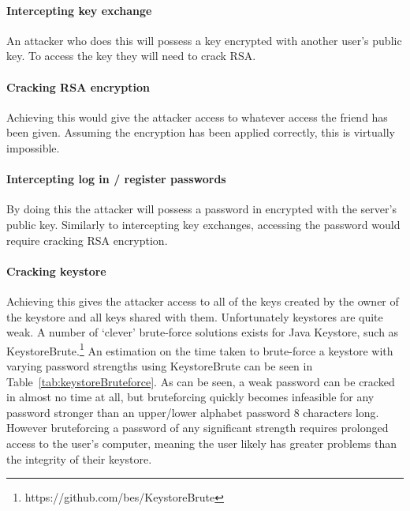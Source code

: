 \documentclass[12pt, titlepage]{article}
\begin{document}
\paragraph*{Intercepting key exchange} An attacker who does this will possess a key encrypted with another user's public key. To access the key they will need to crack RSA.

\paragraph*{Cracking RSA encryption} Achieving this would give the attacker access to whatever access the friend has been given. Assuming the encryption has been applied correctly, this is virtually impossible.

\paragraph*{Intercepting log in / register passwords} By doing this the attacker will possess a password in encrypted with the server's public key. Similarly to intercepting key exchanges, accessing the password would require cracking RSA encryption.

\paragraph*{Cracking keystore} Achieving this gives the attacker access to all of the keys created by the owner of the keystore and all keys shared with them. Unfortunately keystores are quite weak. A number of `clever' brute-force solutions exists for Java Keystore, such as KeystoreBrute.\footnote{https://github.com/bes/KeystoreBrute} An estimation on the time taken to brute-force a keystore with varying password strengths using KeystoreBrute can be seen in Table~\ref{tab:keystoreBruteforce}. As can be seen, a weak password can be cracked in almost no time at all, but bruteforcing quickly becomes infeasible for any password stronger than an upper/lower alphabet password 8 characters long. However bruteforcing a password of any significant strength requires prolonged access to the user's computer, meaning the user likely has greater problems than the integrity of their keystore.
\end{document}
